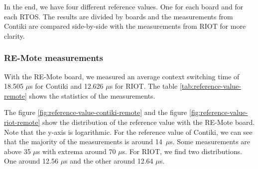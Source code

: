 In the end, we have four different reference values.
One for each board and for each RTOS.
The results are divided by boards and the measurements from Contiki are compared side-by-side with the measurements from RIOT for more clarity.

\subsubsection{RE-Mote measurements}
With the RE-Mote board, we measured an average context switching time of 18.505 $\mu$s for Contiki and  12.626 $\mu$s for RIOT.
The table \ref{tab:reference-value-remote} shows the statistics of the measurements.



The figure \ref{fig:reference-value-contiki-remote} and the figure \ref{fig:reference-value-riot-remote} show the distribution of the reference value with the RE-Mote board.
Note that the y-axis is logarithmic.
For the reference value of Contiki, we can see that the majority of the measurements is around 14~$\mu$s.
Some measurements are above 35 $\mu$s with extrema around 70 $\mu$s.
For RIOT, we find two distributions.
One around 12.56 $\mu$s and the other around 12.64 $\mu$s.

